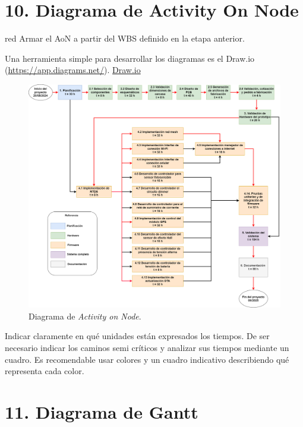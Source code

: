 \documentclass[
11pt, %
]{charter}
\begin{document}
\section{10. Diagrama de Activity On Node}
\label{sec:AoN}

\begin{consigna}{red}
Armar el AoN a partir del WBS definido en la etapa anterior.

Una herramienta simple para desarrollar los diagramas es el Draw.io (\url{https://app.diagrams.net/}).
\href{https://app.diagrams.net}{Draw.io}


\begin{figure}[htpb]
\centering 
\includegraphics[width=.8\textwidth]{./Figuras/AoN.png}
\caption{Diagrama de \textit{Activity on Node}.}
\label{fig:AoN}
\end{figure}

Indicar claramente en qué unidades están expresados los tiempos.
De ser necesario indicar los caminos semi críticos y analizar sus tiempos mediante un cuadro.
Es recomendable usar colores y un cuadro indicativo describiendo qué representa cada color.

\end{consigna}

\section{11. Diagrama de Gantt}
\label{sec:gantt}
\end{document}
